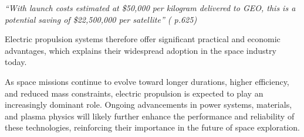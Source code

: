 \begin{center}
\textit{“With launch costs estimated at \$50,000 per kilogram delivered to GEO, this is a potential saving of \$22,500,000 per satellite” (\cite{rpe_book} p.625)}
\end{center}


Electric propulsion systems therefore offer significant practical and economic advantages, which explains their widespread adoption in the space industry today.

As space missions continue to evolve toward longer durations, higher efficiency, and reduced mass constraints, electric propulsion is expected to play an increasingly dominant role. Ongoing advancements in power systems, materials, and plasma physics will likely further enhance the performance and reliability of these technologies, reinforcing their importance in the future of space exploration.